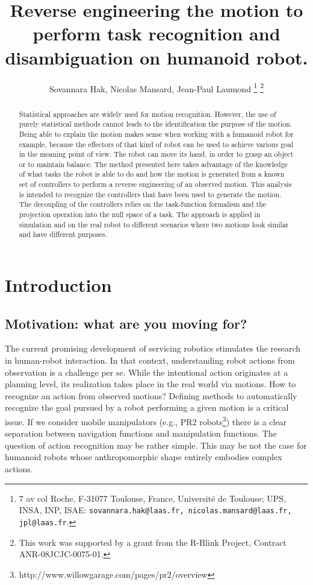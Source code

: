 \documentclass[letterpaper, 10pt, conference]{ieeeconf}      %
\title{\LARGE \bf
Reverse engineering the motion to perform task recognition and disambiguation on humanoid robot.
}
\author{Sovannara Hak, Nicolas Mansard, Jean-Paul Laumond%
  \thanks{7 av col Roche, F-31077 Toulouse, France, Universit\'e de Toulouse; UPS, INSA, INP,
    ISAE: {\tt\small sovannara.hak@laas.fr, nicolas.mansard@laas.fr, jpl@laas.fr}.}
  \thanks{This work was supported by a grant from the R-Blink Project, Contract
    ANR-08JCJC-0075-01.}  }
\begin{document}
\maketitle
\thispagestyle{empty}
\pagestyle{empty}


\begin{abstract}
Statistical approaches are widely used for motion recognition.
However, the use of purely statistical methods cannot leads to
the identification the purpose of the motion. Being able to explain
the motion makes sense when working with a humanoid robot for example,
because the effectors of that kind of robot can be used to achieve various goal in
the meaning point of view. The robot can move its hand, in order to grasp
an object or to maintain balance. The method presented here
takes advantage of the knowledge of what tasks the robot is able to do and how
the motion is generated from a known set of controllers to perform a reverse engineering of an
observed motion. This analysis is intended to recognize the controllers that
have been used to generate the motion. The decoupling of the controllers relies
on the task-function formalism and the projection operation into the null space of a task.
The approach is applied in simulation and on the real robot
to different scenarios where two motions look similar and have
different purposes.
\end{abstract}

\section{Introduction}
\subsection{Motivation: what are you moving for?}

The current promising development of servicing robotics stimulates the
research in human-robot interaction. In that context, understanding
robot actions from observation is a challenge per se. While the
intentional action originates at a planning level, its realization takes
place in the real world via motions. How to recognize an action from
observed motions? Defining methods to automatically recognize the goal
pursued by a robot performing a given motion is a critical issue. If we
consider mobile manipulators (e.g., PR2 robots\footnote{{http://www.willowgarage.com/pages/pr2/overview}})
there is a clear separation between navigation functions and
manipulation functions. The question of action recognition may be rather
simple. This may be not the case for humanoid robots whose
anthropomorphic shape entirely embodies complex actions. 
\end{document}
